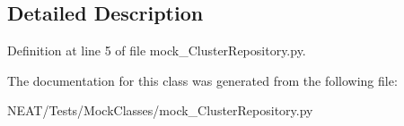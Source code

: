 \subsection{Detailed Description}


Definition at line 5 of file mock\+\_\+\+Cluster\+Repository.\+py.



The documentation for this class was generated from the following file\+:\begin{DoxyCompactItemize}
\item 
N\+E\+A\+T/\+Tests/\+Mock\+Classes/mock\+\_\+\+Cluster\+Repository.\+py\end{DoxyCompactItemize}
